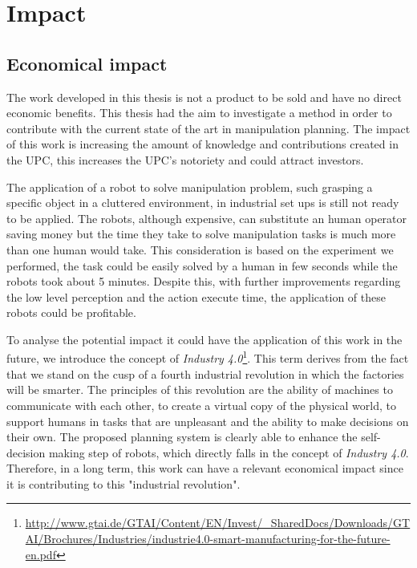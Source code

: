 \section{Impact}
\subsection*{Economical impact}
The work developed in this thesis is not a product to be sold and have no direct economic benefits. This thesis had the aim to investigate a method in order to contribute with the current state of the art in manipulation planning. The impact of this work is increasing the amount of knowledge and contributions created in the UPC, this increases the UPC's notoriety and could attract investors. 

The application of a robot to solve manipulation problem, such grasping a specific object in a cluttered environment, in industrial set ups is still not ready to be applied. The robots, although expensive, can substitute an human operator saving money but the time they take to solve manipulation tasks is much more than one human would take. This consideration is based on the experiment we performed, the task could be easily solved by a human in few seconds while the robots took about 5 minutes. Despite this, with further improvements regarding the low level perception and the action execute time, the application of these robots could be profitable.

To analyse the potential impact it could have the application of this work in the future, we introduce the concept of \textit{Industry 4.0}\footnote{\href{http://www.gtai.de/GTAI/Content/EN/Invest/_SharedDocs/Downloads/GTAI/Brochures/Industries/industrie4.0-smart-manufacturing-for-the-future-en.pdf}{\url{http://www.gtai.de/GTAI/Content/EN/Invest/_SharedDocs/Downloads/GTAI/Brochures/Industries/industrie4.0-smart-manufacturing-for-the-future-en.pdf}}}. This term derives from the fact that we stand on the cusp of a fourth industrial revolution in which the factories will be smarter. The principles of this revolution are the ability of machines to communicate with each other,  to create a virtual copy of the physical world, to support humans in tasks that are unpleasant and the ability to make decisions on their own. The proposed planning system is clearly able to enhance the self-decision making step of robots, which directly falls in the concept of \textit{Industry 4.0}. Therefore, in a long term, this work can have a relevant economical impact since it is contributing to this "industrial revolution". 

